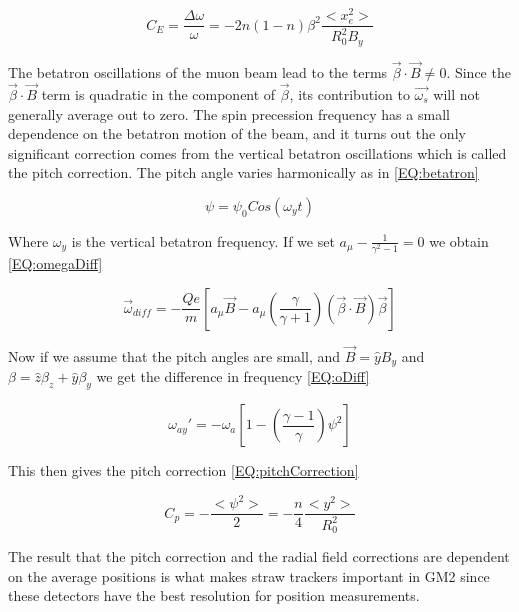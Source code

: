 \documentclass[./Thesis]{subfiles}
\begin{document}
\begin{equation}
\label{EQ:EFieldCorrection}
C_E = \frac{\Delta\omega}{\omega} = -2n(1-n)\beta^2\frac{<x_e^2>}{R_0^2 B_y}
\end{equation}


The betatron oscillations of the muon beam lead to the terms $\vec{\beta}\cdot\vec{B}\neq0$. Since the $\vec{\beta}\cdot\vec{B}$ term is quadratic in the component of $\vec{\beta}$, its contribution to $\vec{\omega_s}$ will not generally average out to zero. The spin precession frequency has a small dependence on the betatron motion of the beam, and it turns out the only significant correction comes from the vertical betatron oscillations which is called the pitch correction. The pitch angle varies harmonically as in \ref{EQ:betatron}

\begin{equation}
\label{EQ:betatron}
\psi = \psi_0 Cos(\omega_y t)
\end{equation}


Where $\omega_y$ is the vertical betatron frequency. If we set $a_\mu - \frac{1}{\gamma^2-1}=0$ we obtain \ref{EQ:omegaDiff}

\begin{equation}
\label{EQ:omegaDiff}
\vec{\omega}_{diff} = - \frac{Qe}{m}[a_\mu \vec{B} - a_\mu(\frac{\gamma}{\gamma+1})(\vec{\beta}\cdot\vec{B})\vec{\beta}]
\end{equation}

Now if we assume that the pitch angles are small, and $\vec{B} = \hat{y} B_y$ and $\beta=\hat{z}\beta_z + \hat{y}\beta_y$ we get the difference in frequency \ref{EQ:oDiff}

\begin{equation}
\label{EQ:oDiff}
\omega_{ay}' = -\omega_a[1-(\frac{\gamma -1 }{\gamma})\psi^2]
\end{equation}


This then gives the pitch correction \ref{EQ:pitchCorrection}

\begin{equation}
\label{EQ:pitchCorrection}
C_p = - \frac{<\psi^2>}{2} = - \frac{n}{4}\frac{<y^2>}{R_0^2}
\end{equation}

The result that the pitch correction and the radial field corrections are dependent on the average positions is what makes straw trackers important in GM2 since these detectors have the best resolution for position measurements. 
\end{document}
